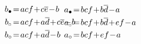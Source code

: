 \documentclass[11pt, letterpaper]{amsart}
\theoremstyle{definition}
\numberwithin{equation}{section}
\def\nsquare{\scalebox{.85}{$\scriptscriptstyle\Box$}}
\begin{document}
\begin{figure}[ht]
\begin{equation*}
\begin{array}{ccccccccc}
 &\multicolumn{2}{c}{
 \begin{aligned}
  b_\bullet &\!=\! acf\!+\!c\overline{e}\!-\!b \\
 b_{\nsquare} &\!=\! acf\!+\!a\overline{d}\! +\!c\overline{e}\!-\!b\\
b_\circ &\!=\! acf\!+\!a\overline{d} \!-\!b 
 \end{aligned}
 \hspace{-20pt}
}
& &\multicolumn{2}{c}{
\hspace{-15pt}
 \begin{aligned}
  a_\bullet &\!=\! bcf\!+\!b\overline{d}\!-\!a \\
 a_{\nsquare} &\!=\! bcf\!+\!b\overline{d}\!+\!ef\!-\!a \\
 a_\circ &\!=\! bcf\!+\!ef\!-\!a
\end{aligned}
 }
 

\end{array}
\end{equation*}
\end{figure}
\end{document}
